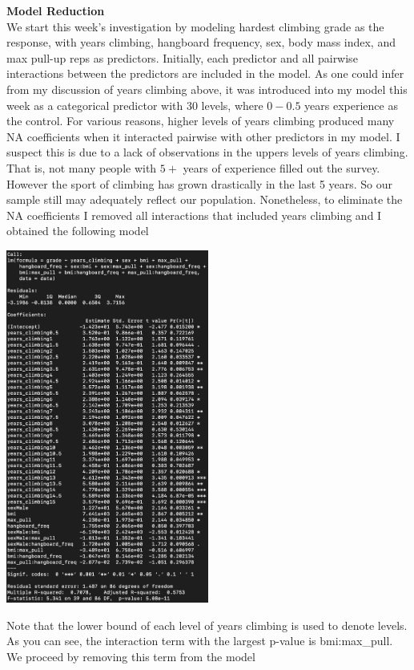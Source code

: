 \documentclass[11pt]{amsart}
\begin{document}
\newpage
{\bf Model Reduction}\\
We start this week's investigation by modeling hardest climbing grade as the response, with years climbing, hangboard frequency, sex, body mass index, and max pull-up reps as predictors. 
Initially, each predictor and all pairwise interactions between the predictors are included in the model.
As one could infer from my discussion of years climbing above, it was introduced into my model this week as a categorical predictor with 30 levels, where $0-0.5$ years experience as the control.
For various reasons, higher levels of years climbing produced many NA coefficients when it interacted pairwise with other predictors in my model.
I suspect this is due to a lack of observations in the uppers levels of years climbing. That is, not many people with $5+$ years of experience filled out the survey.
However the sport of climbing has grown drastically in the last 5 years. 
So our sample still may adequately reflect our population.
Nonetheless, to eliminate the NA coefficients I removed all interactions that included years climbing and I obtained the following model\\

\begin{center}
\includegraphics[width=0.5\textwidth]{mod1}
\end{center}
\vspace{0.15in}
Note that the lower bound of each level of years climbing is used to denote levels.
As you can see, the interaction term with the largest p-value is bmi:max\_pull.
We proceed by removing this term from the model
\end{document}
